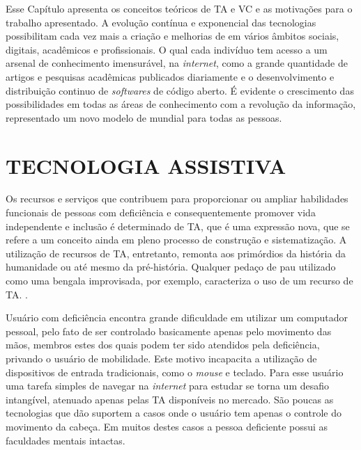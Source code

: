 Esse Capítulo apresenta os conceitos teóricos de TA e VC e as motivações para o trabalho apresentado. A evolução contínua e exponencial das tecnologias possibilitam cada vez mais a criação e melhorias de em vários âmbitos sociais, digitais, acadêmicos e profissionais. O qual cada indivíduo tem acesso a um arsenal de conhecimento imensurável, na \textit{internet}, como a grande quantidade de artigos e pesquisas acadêmicas publicados diariamente e o desenvolvimento e distribuição continuo de \textit{softwares} de código aberto. É evidente o crescimento das possibilidades em todas as áreas de conhecimento com a revolução da informação, representado um novo modelo de mundial para todas as pessoas.
% 
% 


\section{TECNOLOGIA ASSISTIVA}\label{Sub:ta-brasil}
Os recursos e serviços que contribuem para proporcionar ou ampliar habilidades funcionais de pessoas com deficiência e consequentemente promover vida independente e inclusão é determinado de TA, que é uma expressão nova, que se refere a um conceito ainda em pleno processo de construção e sistematização. A utilização de recursos de TA, entretanto, remonta aos primórdios da história da humanidade ou até mesmo da pré-história. Qualquer pedaço de pau utilizado como uma bengala improvisada, por exemplo, caracteriza o uso de um recurso de TA. \cite{galvao2009tecnologia-UPPERCASE}.

Usuário com deficiência encontra grande dificuldade em utilizar um computador pessoal, pelo fato de ser controlado basicamente apenas pelo movimento das mãos, membros estes dos quais podem ter sido atendidos pela deficiência, privando o usuário de mobilidade. Este motivo incapacita a utilização de dispositivos de entrada tradicionais, como o \textit{mouse} e teclado. Para esse usuário uma tarefa simples de navegar na \textit{internet} para estudar se torna um desafio intangível, atenuado apenas pelas TA disponíveis no mercado. São poucas as tecnologias que dão suportem a casos onde o usuário tem apenas o controle do movimento da cabeça. Em muitos destes casos a pessoa deficiente possui as faculdades mentais intactas.
% 
% 

